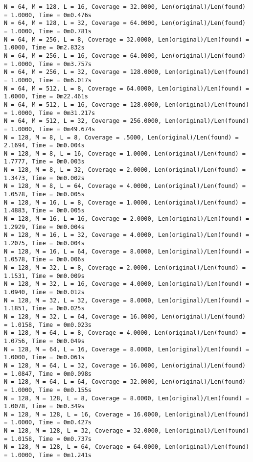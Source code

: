 \documentclass{article}
\begin{document}
{\begin{verbatim}
N = 64, M = 128, L = 16, Coverage = 32.0000, Len(original)/Len(found) = 1.0000, Time = 0m0.476s
N = 64, M = 128, L = 32, Coverage = 64.0000, Len(original)/Len(found) = 1.0000, Time = 0m0.781s
N = 64, M = 256, L = 8, Coverage = 32.0000, Len(original)/Len(found) = 1.0000, Time = 0m2.832s
N = 64, M = 256, L = 16, Coverage = 64.0000, Len(original)/Len(found) = 1.0000, Time = 0m3.757s
N = 64, M = 256, L = 32, Coverage = 128.0000, Len(original)/Len(found) = 1.0000, Time = 0m6.017s
N = 64, M = 512, L = 8, Coverage = 64.0000, Len(original)/Len(found) = 1.0000, Time = 0m22.461s
N = 64, M = 512, L = 16, Coverage = 128.0000, Len(original)/Len(found) = 1.0000, Time = 0m31.217s
N = 64, M = 512, L = 32, Coverage = 256.0000, Len(original)/Len(found) = 1.0000, Time = 0m49.674s
N = 128, M = 8, L = 8, Coverage = .5000, Len(original)/Len(found) = 2.1694, Time = 0m0.004s
N = 128, M = 8, L = 16, Coverage = 1.0000, Len(original)/Len(found) = 1.7777, Time = 0m0.003s
N = 128, M = 8, L = 32, Coverage = 2.0000, Len(original)/Len(found) = 1.3473, Time = 0m0.002s
N = 128, M = 8, L = 64, Coverage = 4.0000, Len(original)/Len(found) = 1.0578, Time = 0m0.005s
N = 128, M = 16, L = 8, Coverage = 1.0000, Len(original)/Len(found) = 1.4883, Time = 0m0.005s
N = 128, M = 16, L = 16, Coverage = 2.0000, Len(original)/Len(found) = 1.2929, Time = 0m0.004s
N = 128, M = 16, L = 32, Coverage = 4.0000, Len(original)/Len(found) = 1.2075, Time = 0m0.004s
N = 128, M = 16, L = 64, Coverage = 8.0000, Len(original)/Len(found) = 1.0578, Time = 0m0.006s
N = 128, M = 32, L = 8, Coverage = 2.0000, Len(original)/Len(found) = 1.1531, Time = 0m0.009s
N = 128, M = 32, L = 16, Coverage = 4.0000, Len(original)/Len(found) = 1.0940, Time = 0m0.012s
N = 128, M = 32, L = 32, Coverage = 8.0000, Len(original)/Len(found) = 1.1851, Time = 0m0.025s
N = 128, M = 32, L = 64, Coverage = 16.0000, Len(original)/Len(found) = 1.0158, Time = 0m0.023s
N = 128, M = 64, L = 8, Coverage = 4.0000, Len(original)/Len(found) = 1.0756, Time = 0m0.049s
N = 128, M = 64, L = 16, Coverage = 8.0000, Len(original)/Len(found) = 1.0000, Time = 0m0.061s
N = 128, M = 64, L = 32, Coverage = 16.0000, Len(original)/Len(found) = 1.0847, Time = 0m0.098s
N = 128, M = 64, L = 64, Coverage = 32.0000, Len(original)/Len(found) = 1.0000, Time = 0m0.155s
N = 128, M = 128, L = 8, Coverage = 8.0000, Len(original)/Len(found) = 1.0078, Time = 0m0.349s
N = 128, M = 128, L = 16, Coverage = 16.0000, Len(original)/Len(found) = 1.0000, Time = 0m0.427s
N = 128, M = 128, L = 32, Coverage = 32.0000, Len(original)/Len(found) = 1.0158, Time = 0m0.737s
N = 128, M = 128, L = 64, Coverage = 64.0000, Len(original)/Len(found) = 1.0000, Time = 0m1.241s

\end{verbatim}}
\end{document}
